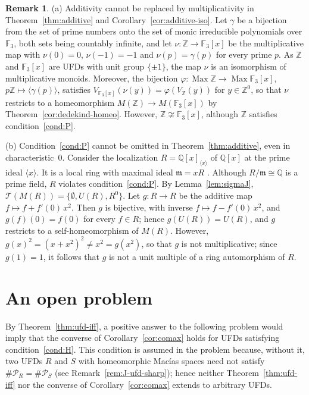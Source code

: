 \documentclass[12pt,reqno,a4paper]{amsart}
\newcommand{\Z}{\mathbb{Z}}
\newcommand{\Q}{\mathbb{Q}}
\newcommand{\F}{\mathbb{F}}
\newcommand{\Pe}{\mathcal{P}}
\newcommand{\m}{\mathfrak{m}}
\DeclareMathOperator{\Max}{Max}
\theoremstyle{plain}
\theoremstyle{definition}
\newtheorem{remark}[theorem]{Remark}
\begin{document}
\begin{remark}\label{rem:additive-sharp}
(a) Additivity cannot be replaced by multiplicativity in Theorem~\ref{thm:additive} and Corollary~\ref{cor:additive-iso}. Let $\gamma$ be a bijection from the set of prime numbers onto the set of monic irreducible polynomials over $\F_3$, both sets being countably infinite, and let $\nu\colon\Z\to\F_3[x]$ be the multiplicative map with $\nu(0)=0$, $\nu(-1)=-1$ and $\nu(p)=\gamma(p)$ for every prime $p$. As $\Z$ and $\F_3[x]$ are UFDs with unit group $\{\pm1\}$, the map $\nu$ is an isomorphism of multiplicative monoids. Moreover, the bijection $\varphi\colon\Max\Z\to\Max\F_3[x]$, $p\Z\mapsto\langle\gamma(p)\rangle$, satisfies $V_{\F_3[x]}(\nu(y))=\varphi(V_\Z(y))$ for $y\in\Z^0$, so that $\nu$ restricts to a homeomorphism $M(\Z)\to M(\F_3[x])$ by Theorem~\ref{cor:dedekind-homeo}. However, $\Z\not\cong\F_3[x]$, although $\Z$ satisfies condition~\ref{cond:P}.

(b) Condition~\ref{cond:P} cannot be omitted in Theorem~\ref{thm:additive}, even in characteristic~$0$. Consider the localization $R=\Q[x]_{\langle x\rangle}$ of $\Q[x]$ at the prime ideal $\langle x\rangle$. It is a local ring with maximal ideal $\m=xR$ \cite[Chapter~3, Example~1]{AtiyahMacdonald}. Although $R/\m\cong\Q$ is a prime field, $R$ violates condition~\ref{cond:P}. By Lemma~\ref{lem:sigmaJ}, $\mathcal{T}(M(R))=\{\emptyset,U(R),R^0\}$. Let $g\colon R\to R$ be the additive map $f\mapsto f+f'(0)\,x^2$. Then $g$ is bijective, with inverse $f\mapsto f-f'(0)\,x^2$, and $g(f)(0)=f(0)$ for every $f\in R$; hence $g(U(R))=U(R)$, and $g$ restricts to a self-homeomorphism of $M(R)$. However, $g(x)^2=(x+x^2)^2\neq x^2=g(x^2)$, so that $g$ is not multiplicative; since $g(1)=1$, it follows that $g$ is not a unit multiple of a ring automorphism of $R$.
\end{remark}
\section{An open problem}\label{sec:conclusion}
By Theorem~\ref{thm:ufd-iff}, a positive answer to the following problem would imply that the converse of Corollary~\ref{cor:comax} holds for UFDs satisfying condition~\ref{cond:H}. This condition is assumed in the problem because, without it, two UFDs $R$ and $S$ with homeomorphic Mac\'ias spaces need not satisfy $\#\Pe_R=\#\Pe_S$ (see Remark~\ref{rem:J-ufd-sharp}); hence neither Theorem~\ref{thm:ufd-iff} nor the converse of Corollary~\ref{cor:comax} extends to arbitrary UFDs.
\end{document}

